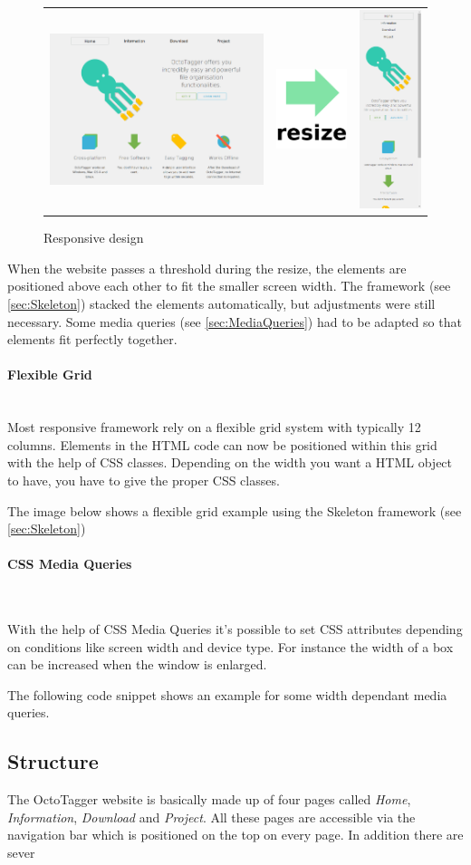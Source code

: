 \begin{figure}
\centering
\begin{tabular}{ c  c c }
\includegraphics[scale=0.20]{images/home_full.png} & \includegraphics[scale=0.30]{images/resize.png} & \includegraphics[scale=0.30]{images/home_small.png} \\
\end{tabular}
\caption{Responsive design}
\end{figure}

When the website passes a threshold during the resize, the elements are positioned above each other to fit the smaller screen width. The framework (see \ref{sec:Skeleton}) stacked the elements automatically, but adjustments were still necessary. Some media queries (see \ref{sec:MediaQueries}) had to be adapted so that elements fit perfectly together.

\paragraph{Flexible Grid} \hspace{0pt} \\

Most responsive framework rely on a flexible grid system with typically 12 columns. Elements in the HTML code can now be positioned within this grid with the help of CSS classes. Depending on the width you want a HTML object to have, you have to give the proper CSS classes.

The image below shows a flexible grid example using the Skeleton framework (see \ref{sec:Skeleton})

\paragraph{CSS Media Queries} \hspace{0pt} \\
\label{sec:MediaQueries}

With the help of CSS Media Queries it's possible to set CSS attributes depending on conditions like screen width and device type. For instance the width of a box can  be increased when the window is enlarged.

The following code snippet shows an example for some width dependant media queries.

\subsection{Structure}

The OctoTagger website is basically made up of four pages called \textit{Home}, \textit{Information}, \textit{Download} and \textit{Project}. All these pages are accessible via the navigation bar which is positioned on the top on every page. In addition there are sever